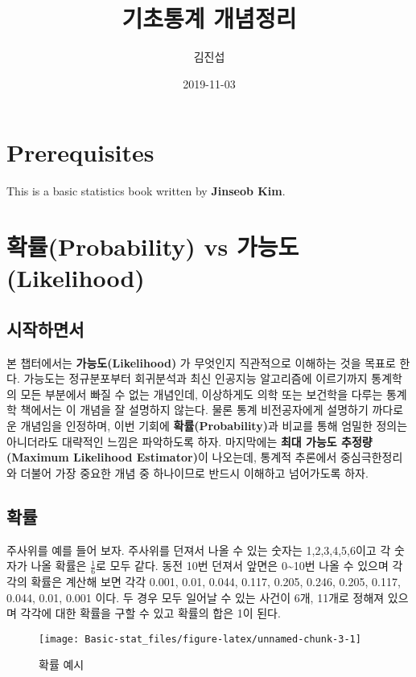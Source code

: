 \documentclass[]{book}
\title{기초통계 개념정리}
\author{김진섭}
\date{2019-11-03}
\begin{document}
\maketitle

{
\setcounter{tocdepth}{1}
\tableofcontents
}
\chapter{Prerequisites}\label{prerequisites}

This is a basic statistics book written by \textbf{Jinseob Kim}.

\chapter{확률(Probability) vs
가능도(Likelihood)}\label{uxd655uxb960probability-vs-uxac00uxb2a5uxb3c4likelihood}

\section{시작하면서}\label{uxc2dcuxc791uxd558uxba74uxc11c}

본 챕터에서는 \textbf{가능도(Likelihood)} 가 무엇인지 직관적으로
이해하는 것을 목표로 한다. 가능도는 정규분포부터 회귀분석과 최신
인공지능 알고리즘에 이르기까지 통계학의 모든 부분에서 빠질 수 없는
개념인데, 이상하게도 의학 또는 보건학을 다루는 통계학 책에서는 이 개념을
잘 설명하지 않는다. 물론 통계 비전공자에게 설명하기 까다로운 개념임을
인정하며, 이번 기회에 \textbf{확률(Probability)}과 비교를 통해 엄밀한
정의는 아니더라도 대략적인 느낌은 파악하도록 하자. 마지막에는
\textbf{최대 가능도 추정량(Maximum Likelihood Estimator)}이 나오는데,
통계적 추론에서 중심극한정리와 더불어 가장 중요한 개념 중 하나이므로
반드시 이해하고 넘어가도록 하자.

\section{확률}\label{uxd655uxb960}

주사위를 예를 들어 보자. 주사위를 던져서 나올 수 있는 숫자는
1,2,3,4,5,6이고 각 숫자가 나올 확률은 \(\frac{1}{6}\)로 모두 같다. 동전
10번 던져서 앞면은 0\textasciitilde{}10번 나올 수 있으며 각각의 확률은
계산해 보면 각각 0.001, 0.01, 0.044, 0.117, 0.205, 0.246, 0.205, 0.117,
0.044, 0.01, 0.001 이다. 두 경우 모두 일어날 수 있는 사건이 6개, 11개로
정해져 있으며 각각에 대한 확률을 구할 수 있고 확률의 합은 1이 된다.

\begin{figure}

{\centering \texttt{[image: Basic-stat\_files/figure-latex/unnamed-chunk-3-1]} 

}

\caption{확률 예시}\label{fig:unnamed-chunk-3}
\end{figure}
\end{document}
